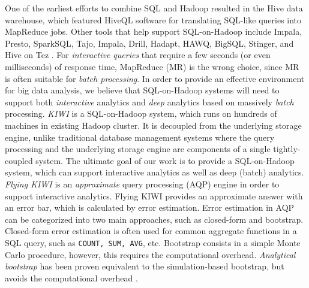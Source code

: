 \documentclass{sig-alternate-05-2015}
\begin{document}
One of the earliest efforts to combine SQL and Hadoop resulted in the Hive data warehouse, which featured HiveQL software for translating SQL-like queries into MapReduce jobs. Other tools that help support SQL-on-Hadoop include Impala, Presto, SparkSQL, Tajo, Impala, Drill, Hadapt, HAWQ, BigSQL, Stinger, and Hive on Tez \cite{Floratou:2014}.
For \textit{interactive queries} that require a few seconds (or even milliseconds) of response time, MapReduce (MR) is the wrong choice, since MR is often suitable for \textit{batch processing}. 
In order to provide an effective environment for big data analysis, we believe that SQL-on-Hadoop systems will need to support both \textit{interactive} analytics and \textit{deep} analytics based on massively \textit{batch} processing. 
\textit{KIWI} is a  SQL-on-Hadoop system, which runs on hundreds of machines in existing Hadoop cluster.
It is decoupled from the underlying storage engine, unlike traditional database management systems where the query processing and the underlying storage engine are components of a single tightly-coupled system.
The ultimate goal of our work is to provide a SQL-on-Hadoop system, which can support interactive analytics as well as deep (batch) analytics. \textit{Flying KIWI} is an \textit{approximate} query processing (AQP) engine in order to support interactive analytics. Flying KIWI provides an approximate answer with an error bar, which is calculated by error estimation. Error estimation in AQP can be categorized into two main approaches, such as closed-form and bootstrap.
Closed-form error estimation is often used for common aggregate functions in a SQL query, such as \texttt{COUNT, SUM, AVG}, etc. 
Bootstrap consists in a simple Monte Carlo procedure, however, this requires the computational overhead. 
\textit{Analytical bootstrap} has been proven equivalent to the simulation-based bootstrap, but avoids the computational overhead \cite{Agarwal:2014}.  
\end{document}
